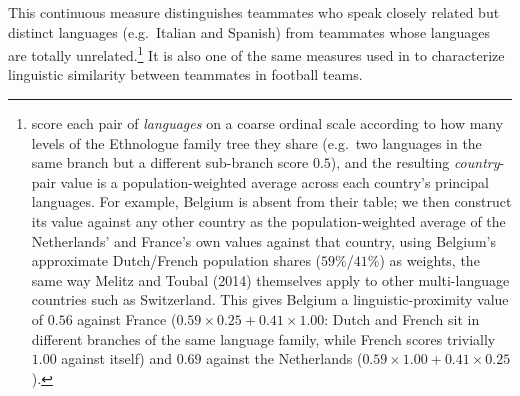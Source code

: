 \documentclass[10pt]{article}
\begin{document}
This continuous measure distinguishes teammates who speak closely related but distinct languages (e.g.\ Italian and Spanish) from teammates whose languages are totally unrelated.\footnote{\citet{melitztoubal2014} score each pair of \emph{languages} on a coarse ordinal scale according to how many levels of the Ethnologue family tree they share (e.g.\ two languages in the same branch but a different sub-branch score $0.5$), and the resulting \emph{country}-pair value is a population-weighted average across each country's principal languages. For example, Belgium is absent from their table; we then construct its value against any other country as the population-weighted average of the Netherlands' and France's own values against that country, using Belgium's approximate Dutch/French population shares ($59\%$/$41\%$) as weights, the same way Melitz and Toubal (2014) themselves apply to other multi-language countries such as Switzerland. This gives Belgium a linguistic-proximity value of $0.56$ against France ($0.59\times0.25+0.41\times1.00$: Dutch and French sit in different branches of the same language family, while French scores trivially $1.00$ against itself) and $0.69$ against the Netherlands ($0.59\times1.00+0.41\times0.25$).} It is also one of the same  measures used in \citet{bekesottaviano2025}  to characterize linguistic similarity between teammates in football teams.


\end{document}

